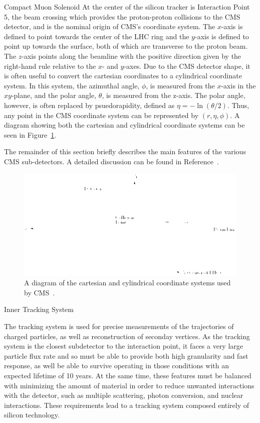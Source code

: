 \begin{section}{Compact Muon Solenoid}
At the center of the silicon tracker is Interaction Point 5, the beam crossing which provides the proton-proton collisions to the CMS detector, and is the nominal origin of CMS's coordinate system.
The $x$-axis is defined to point towards the center of the LHC ring and the $y$-axis is defined to point up towards the surface, both of which are transverse to the proton beam. 
The $z$-axis points along the beamline with the positive direction given by the right-hand rule relative to the $x$- and $y$-axes.
Due to the CMS detector shape, it is often useful to convert the cartesian coordinates to a cylindrical coordinate system.
In this system, the azimuthal angle, $\phi$, is measured from the $x$-axis in the $xy$-plane, and the polar angle, $\theta$, is measured from the z-axis.
The polar angle, however, is often replaced by psuedorapidity, defined as $\eta = -\ln(\theta/2)$.
Thus, any point in the CMS coordinate system can be represented by $(r, \eta, \phi)$.
A diagram showing both the cartesian and cylindrical coordinate systems can be seen in Figure~\ref{fig:cms_coordinate_system}.

The remainder of this section briefly describes the main features of the various CMS sub-detectors.
A detailed discussion can be found in Reference~\cite{Chatrchyan:2008aa}.

\begin{figure}[tbp!]
\begin{center}
\includegraphics[angle=0,width=0.80\columnwidth]{fig/cms_coordinate_system.png}
\end{center}
\caption{A diagram of the cartesian and cylindrical coordinate systems used by CMS~\cite{Schott:1699952}.}
\label{fig:cms_coordinate_system}
\end{figure}

\begin{subsection}{Inner Tracking System}

The tracking system is used for precise measurements of the trajectories of charged particles, as well as reconstruction of seconday vertices.
As the tracking system is the closest subdetector to the interaction point, it faces a very large particle flux rate and so must be able to provide both high granularity and fast response, as well be able to survive operating in those conditions with an expected lifetime of 10 years.
At the same time, these features must be balanced with minimizing the amount of material in order to reduce unwanted interactions with the detector, such as multiple scattering, photon conversion, and nuclear interactions.
These requirements lead to a tracking system composed entirely of silicon technology.


\end{subsection}
\end{section}
